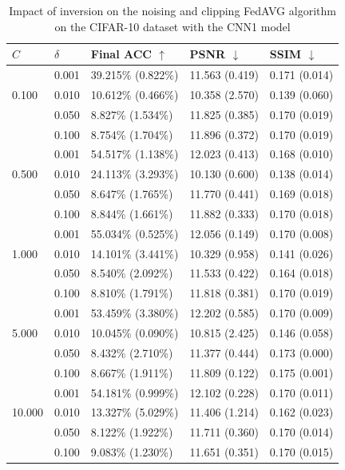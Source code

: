 \documentclass[conference,compsoc]{IEEEtran}
\begin{document}
\begin{table}[H]
\centering
\caption{Impact of inversion on the noising and clipping FedAVG algorithm on the CIFAR-10 dataset with the CNN1 model}
\label{table:dp_cifar10_cnn1}
\begin{tabular}{lllll}
\hline
$C$ & $\delta$ & \textbf{Final ACC} $\uparrow$ & \textbf{PSNR} $\downarrow$ & \textbf{SSIM} $\downarrow$ \\
\hline
\multirow{3}{*}{0.100} & 0.001 & 39.215\% (0.822\%) & 11.563 (0.419) & 0.171 (0.014) \\
& 0.010 & 10.612\% (0.466\%) & 10.358 (2.570) & 0.139 (0.060) \\
& 0.050 & 8.827\% (1.534\%) & 11.825 (0.385) & 0.170 (0.019) \\
& 0.100 & 8.754\% (1.704\%) & 11.896 (0.372) & 0.170 (0.019) \\
\hline
\multirow{3}{*}{0.500} & 0.001 & 54.517\% (1.138\%) & 12.023 (0.413) & 0.168 (0.010) \\
& 0.010 & 24.113\% (3.293\%) & 10.130 (0.600) & 0.138 (0.014) \\
& 0.050 & 8.647\% (1.765\%) & 11.770 (0.441) & 0.169 (0.018) \\
& 0.100 & 8.844\% (1.661\%) & 11.882 (0.333) & 0.170 (0.018) \\
\hline
\multirow{3}{*}{1.000} & 0.001 & 55.034\% (0.525\%) & 12.056 (0.149) & 0.170 (0.008) \\
& 0.010 & 14.101\% (3.441\%) & 10.329 (0.958) & 0.141 (0.026) \\
& 0.050 & 8.540\% (2.092\%) & 11.533 (0.422) & 0.164 (0.018) \\
& 0.100 & 8.810\% (1.791\%) & 11.818 (0.381) & 0.170 (0.019) \\
\hline
\multirow{3}{*}{5.000} & 0.001 & 53.459\% (3.380\%) & 12.202 (0.585) & 0.170 (0.009) \\
& 0.010 & 10.045\% (0.090\%) & 10.815 (2.425) & 0.146 (0.058) \\
& 0.050 & 8.432\% (2.710\%) & 11.377 (0.444) & 0.173 (0.000) \\
& 0.100 & 8.667\% (1.911\%) & 11.809 (0.122) & 0.175 (0.001) \\
\hline
\multirow{3}{*}{10.000} & 0.001 & 54.181\% (0.999\%) & 12.102 (0.228) & 0.170 (0.011) \\
& 0.010 & 13.327\% (5.029\%) & 11.406 (1.214) & 0.162 (0.023) \\
& 0.050 & 8.122\% (1.922\%) & 11.711 (0.360) & 0.170 (0.014) \\
& 0.100 & 9.083\% (1.230\%) & 11.651 (0.351) & 0.170 (0.015) \\
\hline
\end{tabular}
\end{table}
\end{document}
